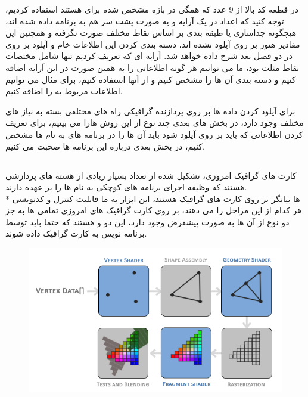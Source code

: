 \documentclass[a4paper, 12pt]{book}
\newcommand{\lrit}[1]{\lr{\textit{#1}}}
\begin{document}
     در قطعه کد بالا از 9 عدد که همگی در بازه مشخص شده برای  هستند استفاده کردیم، توجه کنید که اعداد در یک آرایه و یه صورت پشت سر هم به برنامه داده شده اند، هیچگونه جداسازی یا طبقه بندی بر اساس نقاط مختلف صورت نگرفته و همچنین این مقادیر هنوز بر روی  آپلود نشده اند، دسته بندی کردن این اطلاعات خام و آپلود بر روی  در دو فصل بعد شرح داده خواهد شد.
     آرایه ای که تعریف کردیم تنها شامل مختصات نقاط مثلت بود، ما می توانیم هر گونه اطلاعاتی را به همین صورت در این آرایه اضافه کنیم و دسته بندی آن ها را مشخص کنیم و از آنها استفاده کنیم، برای مثال می توانیم اطلاعات مربوط به  را اضافه کنیم.\par
     برای آپلود کردن داده ها بر روی پردازنده گرافیکی راه های مختلفی بسته به نیاز های مختلف وجود دارد، در بخش های بعدی چند نوع از این روش هارا می بینیم، برای تعریف کردن اطلاعاتی که باید بر روی  آپلود شود باید آن ها را در برنامه های به نام  ها مشخص کنیم، در بخش بعدی درباره این برنامه ها صحبت می کنیم.


\newpage
\subsection*{}
\noindent
\normalsize
    کارت های گرافیک امروزی، تشکیل شده از تعداد بسیار زیادی از هسته های پردازشی هستند که وظیفه اجرای برنامه های کوچکی به نام \lrit{Shader} ها را بر عهده دارند.\\*
     ها بیانگر  بر روی کارت های گرافیک هستند، این ابزار به ما قابلیت کنترل و کدنویسی هر کدام از این مراحل را می دهند، بر روی کارت گرافیک های امروزی
    تمامی  ها به جز دو نوع از آن ها به صورت پیشفرض وجود دارد، این دو  و  هستند که حتما باید توسط برنامه نویس به کارت گرافیک داده شوند.

\vspace*{0.6cm}
\begin{figure}[ht]
    \centering
    \href{https://learnopengl.com}{
        \includegraphics[width=12cm]{pipeline.png}
    }
    \caption{}
    \label{fig:my_label}
\end{figure}
\vspace*{0.6cm}
\end{document}
